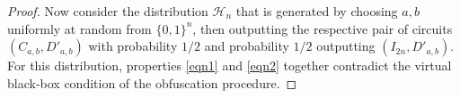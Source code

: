 \documentclass[11pt]{article}
\numberwithin{equation}{section}
\begin{document}
{\begin{proof}
Now consider the distribution $\mathcal{H}_n$ that is generated by choosing $a,b$ uniformly at random from $\{0,1\}^n$, then outputting the respective pair of circuits $(C_{a,b},D'_{a,b})$ with probability $1/2$ and probability $1/2$ outputting $(I_{2n},D'_{a,b})$.  For this distribution, properties \ref{eqn1} and \ref{eqn2} together contradict the virtual black-box condition of the obfuscation procedure.
\end{proof}

}
\end{document}
